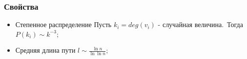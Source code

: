 \frametitle{Свойства}

\begin{itemize}[<+(1)->] 
    \item{Степенное распределение} Пусть $k_i = deg(v_i)$ - случайная величина.\
    Тогда $P(k_i) \sim k^{-3}$;
    
    \item{Средняя длина пути} $l \sim \frac{\ln n}{\ln \ln n}$;
    
\end{itemize} 
